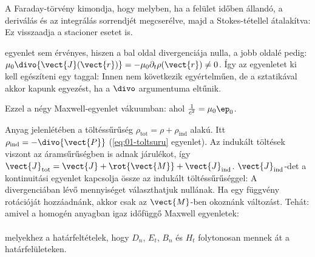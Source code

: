    A Faraday-törvény kimondja, hogy 
   melyben, ha a felület időben állandó, a deriválás és az integrálás sorrendjét megcserélve, majd a Stokes-tétellel átalakítva:
   Ez visszaadja a stacioner esetet is. 
   
    egyenlet sem érvényes, hiszen a bal oldal divergenciája nulla, a jobb oldalé pedig: $\mu_0\divo{\vect{J}(\vect{r})}=-\mu_0\partial_t\rho(\vect{r})\neq 0$. Így az egyenletet ki kell egészíteni egy taggal:
   Innen nem következik egyértelműen, de a sztatikával akkor kapunk egyezést, ha a $\divo$ argumentuma eltűnik. 
   
   Ezzel a négy Maxwell-egyenlet vákuumban:
   ahol $\frac{1}{c^2}=\mu_0\ep_0$.
   
   Anyag jelenlétében a töltéssűrűség $\rho_\text{tot}=\rho+\rho_\text{ind}$ alakú.
   Itt $\rho_\text{ind}=-\divo{\vect{P}}$ (\eqref{eq:01-toltsuru} egyenlet).
   Az indukált töltések viszont az áramsűrűségben is adnak járulékot, így   $\vect{J}_\text{tot}=\vect{J}+\rot{\vect{M}}+\vect{J}_\text{ind}$. $\vect{J}_\text{ind}$-det a kontinuitási egyenlet kapcsolja össze az indukált töltéssűrűséggel: 
   A divergenciában lévő mennyiséget választhatjuk nullának.
   Ha egy függvény rotációját hozzáadnánk, akkor csak az $\vect{M}$-ben okoznánk változást.
   Tehát:
   amivel a homogén anyagban igaz időfüggő Maxwell egyenletek:
  \\[6pt]
  \\[10pt]
  melyekhez a határfeltételek, hogy $D_n$, $E_t$, $B_n$ és $H_t$ folytonosan mennek át a határfelületeken.

